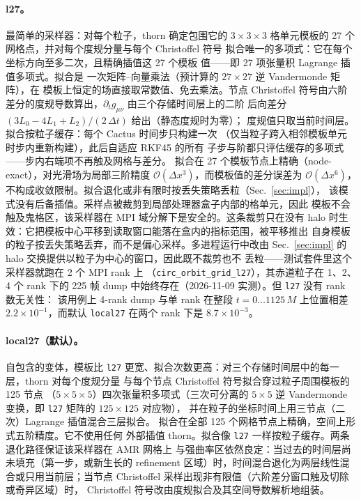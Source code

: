 \documentclass[11pt,UTF8]{ctexart}
\begin{document}
\paragraph{l27。}
最简单的采样器：对每个粒子，thorn 确定包围它的 $3\times3\times3$
格单元模板的 27 个网格点，并对每个度规分量与每个 Christoffel 符号
拟合唯一的多项式：它在每个坐标方向至多二次，且精确插值这 27 个模板
值——即 27 项张量积 Lagrange 插值多项式\citep{berrut2004}。拟合是
一次矩阵--向量乘法（预计算的 $27\times27$ 逆 Vandermonde 矩阵），在
模板上恒定的场直接取常数值、免去乘法。节点 Christoffel 符号由六阶
差分的度规导数算出，$\partial_t g_{\mu\nu}$ 由三个存储时间层上的二阶
后向差分 $(3L_0-4L_1+L_2)/(2\,\Delta t)$ 给出（静态度规时为零）；
度规值只取当前时间层。拟合按粒子缓存：每个 Cactus 时间步只构建一次
（仅当粒子跨入相邻模板单元时步内重新构建），此后自适应 RKF45 的所有
子步与阶都只评估缓存的多项式——步内右端项不再触及网格与差分。
拟合在 27 个模板节点上精确（node-exact），对光滑场为局部三阶精度
$\mathcal{O}(\Delta x^3)$，而模板值的差分误差为 $\mathcal{O}(\Delta x^6)$，
不构成收敛限制。拟合退化或非有限时按丢失策略丢粒（Sec.~\ref{sec:impl}），
该模式没有后备插值。采样点被裁剪到局部处理器盒子内部的格单元，因此
模板不会触及鬼格区，该采样器在 MPI 域分解下是安全的。这条裁剪只在没有
halo 时生效：它把模板中心平移到读取窗口能落在盒内的指标范围，被平移推出
自身模板的粒子按丢失策略丢弃，而不是偏心采样。多进程运行中改由
Sec.~\ref{sec:impl} 的 halo 交换提供以粒子为中心的窗口，因此既不裁剪也不
丢粒——测试套件里这个采样器就跑在 2 个 MPI rank 上
（\texttt{circ\_orbit\_grid\_l27}），其赤道粒子在 1、2、4 个 rank 下的 225
帧 dump 中始终存在（2026-11-09 实测）。但 \texttt{l27} 没有 rank 数无关性：
该用例上 4-rank dump 与单 rank 在整段 $t = 0 \ldots 1125\,M$ 上位置相差
$2.2\times10^{-1}$，而默认 \texttt{local27} 在两个 rank 下是
$8.7\times10^{-3}$。

\paragraph{local27（默认）。}
自包含的变体，模板比 \texttt{l27} 更宽、拟合次数更高：对三个存储时间层中的每一层，thorn 对每个度规分量
与每个节点 Christoffel 符号拟合穿过粒子周围模板的 125 节点
（$5\times5\times5$）四次张量积多项式（三次可分离的 $5\times5$ 逆
Vandermonde 变换，即 \texttt{l27} 矩阵的 $125\times125$ 对应物），
并在粒子的坐标时间上用三节点（二次）Lagrange 插值混合三层拟合。
拟合在全部 125 个网格节点上精确，空间上形式五阶精度。它不使用任何
外部插值 thorn。拟合像
\texttt{l27} 一样按粒子缓存。两条退化路径保证该采样器在 AMR 网格上
与强曲率区依然良定：当过去的时间层尚未填充（第一步，或新生长的
refinement 区域）时，时间混合退化为两层线性混合或只用当前层；当节点
Christoffel 采样出现非有限值（六阶差分窗口触及切除或奇异区域）时，
Christoffel 符号改由度规拟合及其空间导数解析地组装。
\end{document}
